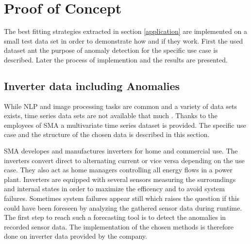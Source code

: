 \section{Proof of Concept}\label{implementation}
The best fitting strategies extracted in section \ref{application} are implemented on a small test data set in order to demonstrate how and if they work. First the used dataset ant the purpose of anomaly detection for the specific use case is described. Later the process of implemention and the results are presented.
\subsection{Inverter data including Anomalies}
While NLP and image processing tasks are common and a variety of data sets exists, time series data sets are not available that much \cite{ma_survey_2023}. Thanks to the employees of SMA a multivariate time series dataset is provided. The specific use case and the structure of the chosen data is described in this section.

SMA developes and manufactures inverters for home and commercial use. The inverters convert direct to alternating current or vice versa depending on the use case. They also act as home managers controlling all energy flows in a power plant. Inverters are equipped with several sensors measuring the surroundings and internal states in order to maximize the efficency and to avoid system failures. Sometimes system failures appear still which raises the question if this could have been foreseen by analyzing the gathered sensor data during runtime. The first step to reach such a forecasting tool is to detect the anomalies in recorded sensor data. The implementation of the chosen methods is therefore done on inverter data provided by the company.

